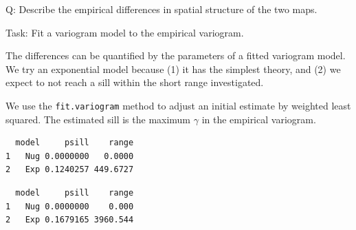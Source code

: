 \documentclass[
  letterpaper,
  DIV=11,
  numbers=noendperiod]{scrartcl}
\newenvironment{Shaded}{\begin{snugshade}}{\end{snugshade}}
\newcommand{\AttributeTok}[1]{\textcolor[rgb]{0.40,0.45,0.13}{#1}}
\newcommand{\DecValTok}[1]{\textcolor[rgb]{0.68,0.00,0.00}{#1}}
\newcommand{\FloatTok}[1]{\textcolor[rgb]{0.68,0.00,0.00}{#1}}
\newcommand{\FunctionTok}[1]{\textcolor[rgb]{0.28,0.35,0.67}{#1}}
\newcommand{\NormalTok}[1]{\textcolor[rgb]{0.00,0.23,0.31}{#1}}
\newcommand{\OtherTok}[1]{\textcolor[rgb]{0.00,0.23,0.31}{#1}}
\newcommand{\SpecialCharTok}[1]{\textcolor[rgb]{0.37,0.37,0.37}{#1}}
\newcommand{\StringTok}[1]{\textcolor[rgb]{0.13,0.47,0.30}{#1}}
\begin{document}
Q: Describe the empirical differences in spatial structure of the two
maps.

Task: Fit a variogram model to the empirical variogram.

The differences can be quantified by the parameters of a fitted
variogram model. We try an exponential model because (1) it has the
simplest theory, and (2) we expect to not reach a sill within the short
range investigated.

We use the \texttt{fit.variogram} method to adjust an initial estimate
by weighted least squared. The estimated sill is the maximum \(\gamma\)
in the empirical variogram.

\begin{Shaded}
\end{Shaded}

\begin{verbatim}
  model     psill    range
1   Nug 0.0000000   0.0000
2   Exp 0.1240257 449.6727
\end{verbatim}

\begin{Shaded}
\end{Shaded}

\begin{verbatim}
  model     psill    range
1   Nug 0.0000000    0.000
2   Exp 0.1679165 3960.544
\end{verbatim}
\end{document}
